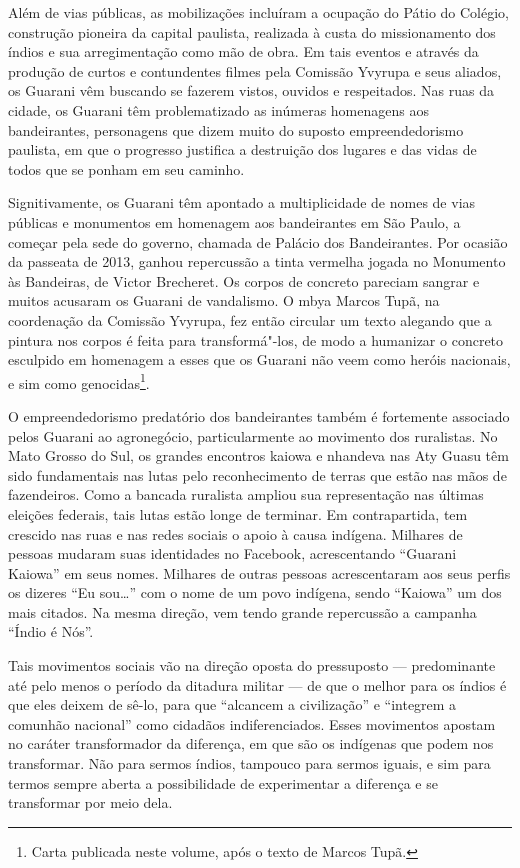 Além de vias públicas, as mobilizações incluíram a ocupação do Pátio do
Colégio, construção pioneira da capital paulista, realizada à custa do
missionamento dos índios e sua arregimentação como mão de obra. Em tais
eventos e através da produção de curtos e contundentes filmes pela
Comissão Yvyrupa e seus aliados, os Guarani vêm buscando se fazerem
vistos, ouvidos e respeitados. Nas ruas da cidade, os Guarani têm
problematizado as inúmeras homenagens aos bandeirantes, personagens que
dizem muito do suposto empreendedorismo paulista, em que o progresso
justifica a destruição dos lugares e das vidas de todos que se ponham
em seu caminho.

Signitivamente, os Guarani têm apontado a multiplicidade de nomes de
vias públicas e monumentos em homenagem aos bandeirantes em São Paulo,
a começar pela sede do governo, chamada de Palácio dos Bandeirantes.
Por ocasião da passeata de 2013, ganhou repercussão a tinta vermelha
jogada no Monumento às Bandeiras, de Victor Brecheret. Os corpos de
concreto pareciam sangrar e muitos acusaram os Guarani de vandalismo. O
mbya Marcos Tupã, na coordenação da Comissão Yvyrupa, fez então
circular um texto alegando que a pintura nos corpos é feita para
transformá"-los, de modo a humanizar o concreto esculpido em homenagem a
esses que os Guarani não veem como heróis nacionais, e sim como
genocidas\footnote{Carta publicada neste volume, após o texto de
Marcos Tupã.}.

O empreendedorismo predatório dos bandeirantes também é fortemente
associado pelos Guarani ao agronegócio, particularmente ao movimento
dos ruralistas. No Mato Grosso do Sul, os grandes encontros kaiowa e
nhandeva nas Aty Guasu têm sido fundamentais nas lutas pelo
reconhecimento de terras que estão nas mãos de fazendeiros. Como a
bancada ruralista ampliou sua representação nas últimas eleições
federais, tais lutas estão longe de terminar. Em contrapartida, tem
crescido nas ruas e nas redes sociais o apoio à causa indígena.
Milhares de pessoas mudaram suas identidades no Facebook, acrescentando
``Guarani Kaiowa'' em seus nomes. Milhares de outras pessoas
acrescentaram aos seus perfis os dizeres ``Eu sou\ldots{}'' com o nome de um
povo indígena, sendo ``Kaiowa'' um dos mais citados. Na mesma direção,
vem tendo grande repercussão a campanha ``Índio é Nós''.

Tais movimentos sociais vão na direção oposta do pressuposto —
predominante até pelo menos o período da ditadura militar — de que o
melhor para os índios é que eles deixem de sê-lo, para que ``alcancem a
civilização'' e ``integrem a comunhão nacional'' como cidadãos
indiferenciados. Esses movimentos apostam no caráter transformador da
diferença, em que são os indígenas que podem nos transformar. Não para
sermos índios, tampouco para sermos iguais, e sim para termos sempre
aberta a possibilidade de experimentar a diferença e se transformar por
meio dela.

